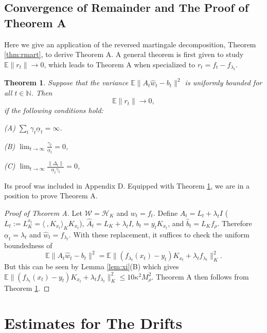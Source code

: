 \documentclass[twoside,11pt]{amsart}
\theoremstyle{theorem}
\newtheorem{thm}{Theorem}[section]
\theoremstyle{definition}
\theoremstyle{remark}
\newcommand{\DS}{\displaystyle}
\def\<{{\langle}}
\def\>{{\rangle}}
\def\E{{\mathbb E}}        %
\def\A{\hat{A}}
\def\b{\hat{b}}
\def\w{\hat{w}}
\def\M{M_\rho}
\def\H{{\mathscr H}}
\def\W{{\mathscr W}}
\def\N{{\mathbb N}}
\def\amin{{\underline{\alpha}} }
\def\la{\lambda}
\def\ka{\kappa}
\begin{document}
\subsection{Convergence of Remainder and The Proof of Theorem A}

Here we give an application of the reversed martingale decomposition, Theorem \ref{thm:rmart}, to derive Theorem A. A general theorem is first
given to study $\E \|r_t\|\to 0$, which leads to Theorem A when specialized to $r_t = f_t - f_{\la_t}$. 

\begin{thm}\label{thm:convergence}
Suppose that the variance $\E \|A_t \w_t - b_t \|^2$ is uniformly bounded for all $t\in \N$.
Then
\[ \E \|r_t \| \to 0, \]
if the following conditions hold: 

\noindent (A) $\DS \sum_{t} \gamma_t \amin_t = \infty$.

\noindent (B) $\DS \lim_{t\to \infty} \frac{\gamma_t}{\amin_t} =0$,

\noindent (C) $\DS \lim_{t\to \infty} \frac{\|\Delta_t\|}{\amin_t \gamma_t } =0$, 

\end{thm}

Its proof was included in Appendix D. Equipped with Theorem \ref{thm:convergence}, we are in a position to prove Theorem A. 

\begin{proof}[Proof of Theorem A]
Let $\W=\H_K$ and $w_t=f_t$. Define $A_t = L_t + \lambda_t I$ ($L_t:=L_K^{x_t}=\<\ ,K_{x_t}\>_K K_{x_t}$), $\A_t = L_K + \lambda_t I$, $b_t = y_t K_{x_t} $, and $\b_t =L_K f_\rho$. 
Therefore $\amin_t = \la_t$ and $\w_t = f_{\la_t}$. With these replacement, it suffices to check the uniform boundedness of 
$$\E \|A_t \w_t - b_t \|^2=\E\|(f_{\la_t}(x_t) - y_t)K_{x_t} + \la_t f_{\la_t}\|_K^2. $$
But this can be seen by Lemma \ref{lem:xi}(B) which gives $\E\|(f_{\la_t}(x_t) - y_t)K_{x_t} + \la_t f_{\la_t}\|_K^2\leq 10\ka^2 \M^2$. 
Theorem A then follows from Theorem \ref{thm:convergence}.
\end{proof}


\section{Estimates for The Drifts} \label{sec:drifts}

\end{document}
